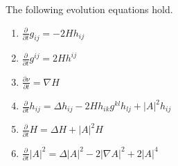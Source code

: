 \begin{lemma}
	The following evolution equations hold.
	\begin{enumerate}

		\item $\frac{\partial }{\partial t} g_{ij}=-2Hh_{ij}$
		\item $\frac{\partial }{\partial t} g^{ij}=2Hh^{ij}$
		\item $\frac{\partial \nu }{\partial t} = \nabla H$
		\item $\frac{\partial }{\partial t} h_{ij}=\Delta h_{ij}-2Hh_{ik}g^{kl}h_{lj}+\left| A \right| ^2 h_{ij}$
		\item $\frac{\partial }{\partial t} H=\Delta H+ \left| A \right| ^2 H$
		\item $\frac{\partial }{\partial t} \left| A \right| ^2 = \Delta \left| A \right| ^2 - 2 \left| \nabla A \right| ^2 + 2 \left| A \right| ^4$
	\end{enumerate}
\end{lemma}

